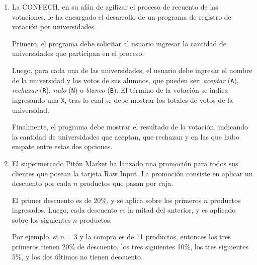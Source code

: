 \documentclass[11pt,spanish]{article}
\newcommand{\pond}[1]{[{\small\textbf{#1\%}}]}
\begin{document}
\begin{enumerate}[font=\Large\bfseries]
    \newpage
    \item
      \pond{25}
      La CONFECH,
      en su afán de agilizar el proceso de recuento de las votaciones,
      le ha encargado el desarrollo de un programa de registro de votación por universidades.

      \begin{minipage}[t]{.5\textwidth}
        Primero, el programa debe solicitar al usuario ingresar
        la cantidad de universidades que participan en el proceso.
        \vspace{1ex}

        Luego, para cada una de las universidades,
        el usuario debe ingresar
        el nombre de la universidad
        y los votos de sus alumnos, que pueden ser:
        \emph{aceptar} (\texttt{A}),
        \emph{rechazar} (\texttt{R}),
        \emph{nulo} (\texttt{N}) o
        \emph{blanco} (\texttt{B}).
        El término de la votación se indica ingresando una \texttt{X},
        tras lo cual se debe mostrar los totales de votos de la universidad.
        \vspace{1ex}

        Finalmente,
        el programa debe mostrar el resultado de la votación,
        indicando la cantidad de universidades que aceptan, que rechazan
        y en las que hubo empate entre estas dos opciones.

      \end{minipage}
      \hfill
      \begin{minipage}[t]{.4\textwidth}
        
      \end{minipage}

    \newpage
    \item
      \pond{25}
      El supermercado Pitón Market ha lanzado una promoción
      para todos sus clientes que posean la tarjeta Raw Input.
      La promoción consiste en aplicar un descuento
      por cada \(n\) productos que pasan por caja.

      \begin{minipage}[t]{.55\textwidth}
        El primer descuento es de 20\%,
        y se aplica sobre los primeros \(n\) productos ingresados.
        Luego,
        cada descuento es la mitad del anterior,
        y es aplicado sobre los siguientes \(n\) productos.
        \vspace{1ex}

        Por ejemplo,
        si \(n = 3\) y la compra es de 11 productos,
        entonces los tres primeros tienen 20\% de descuento,
        los tres siguientes 10\%,
        los tres siguientes 5\%,
        y los dos últimos no tienen descuento.
        \vspace{1ex}


\end{minipage}
\end{enumerate}
\end{document}
